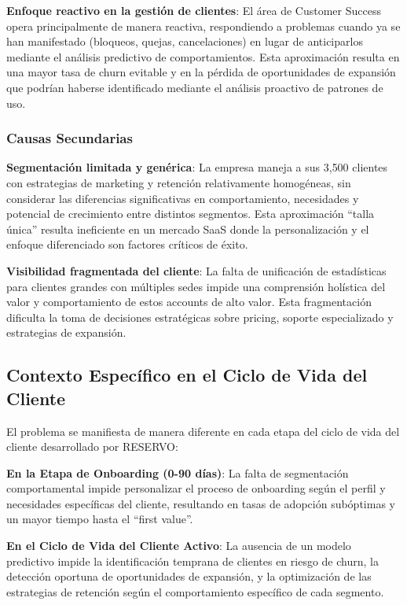 \textbf{Enfoque reactivo en la gestión de clientes}: El área de Customer Success opera principalmente de manera reactiva, respondiendo a problemas cuando ya se han manifestado (bloqueos, quejas, cancelaciones) en lugar de anticiparlos mediante el análisis predictivo de comportamientos. Esta aproximación resulta en una mayor tasa de churn evitable y en la pérdida de oportunidades de expansión que podrían haberse identificado mediante el análisis proactivo de patrones de uso.

\subsubsection{Causas Secundarias}

\textbf{Segmentación limitada y genérica}: La empresa maneja a sus 3{,}500 clientes con estrategias de marketing y retención relativamente homogéneas, sin considerar las diferencias significativas en comportamiento, necesidades y potencial de crecimiento entre distintos segmentos. Esta aproximación ``talla única'' resulta ineficiente en un mercado SaaS donde la personalización y el enfoque diferenciado son factores críticos de éxito.

\textbf{Visibilidad fragmentada del cliente}: La falta de unificación de estadísticas para clientes grandes con múltiples sedes impide una comprensión holística del valor y comportamiento de estos accounts de alto valor. Esta fragmentación dificulta la toma de decisiones estratégicas sobre pricing, soporte especializado y estrategias de expansión.

\subsection{Contexto Específico en el Ciclo de Vida del Cliente}

El problema se manifiesta de manera diferente en cada etapa del ciclo de vida del cliente desarrollado por RESERVO:

\textbf{En la Etapa de Onboarding (0-90 días)}: La falta de segmentación comportamental impide personalizar el proceso de onboarding según el perfil y necesidades específicas del cliente, resultando en tasas de adopción subóptimas y un mayor tiempo hasta el ``first value''.

\textbf{En el Ciclo de Vida del Cliente Activo}: La ausencia de un modelo predictivo impide la identificación temprana de clientes en riesgo de churn, la detección oportuna de oportunidades de expansión, y la optimización de las estrategias de retención según el comportamiento específico de cada segmento.

